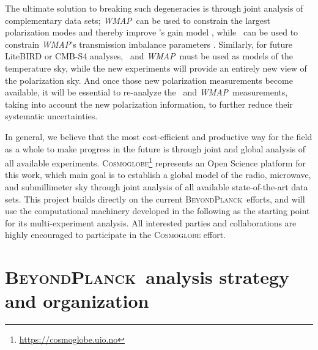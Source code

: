 \documentclass[onecolumn]{aa}
\def\WMAP{\emph{WMAP}}
\newcommand{\BP}{\textsc{BeyondPlanck}}
\begin{document}
The ultimate solution to breaking such degeneracies is through joint
analysis of complementary data sets; \WMAP\ can be used to constrain
the largest polarization modes and thereby improve \Planck's gain
model \citep{planck2016-l02}, while \Planck\ can be used to constrain
\WMAP's transmission imbalance parameters
\citep{jarosik2007}. Similarly, for future LiteBIRD or CMB-S4
analyses, \Planck\ and \WMAP\ must be used as models of the
temperature sky, while the new experiments will provide an entirely
new view of the polarization sky. And once those new polarization
measurements become available, it will be essential to re-analyze the
\Planck\ and \WMAP\ measurements, taking into account the new
polarization information, to further reduce their systematic
uncertainties.

In general, we believe that the most cost-efficient and productive way for the field
as a whole to make progress in the future is through joint and global
analysis of all available experiments.
\textsc{Cosmoglobe}\footnote{\url{https://cosmoglobe.uio.no}}
represents an Open Science platform for this work, which main goal is
to establish a global model of the radio, microwave, and submillimeter
sky through joint analysis of all available state-of-the-art data
sets. This project builds directly on the current \BP\ efforts, and
will use the computational machinery developed in the following as the
starting point for its multi-experiment analysis. All interested
parties and collaborations are highly encouraged to participate in the
\textsc{Cosmoglobe} effort.


\section{\BP\ analysis strategy and organization}
\label{sec:overview}
\end{document}
